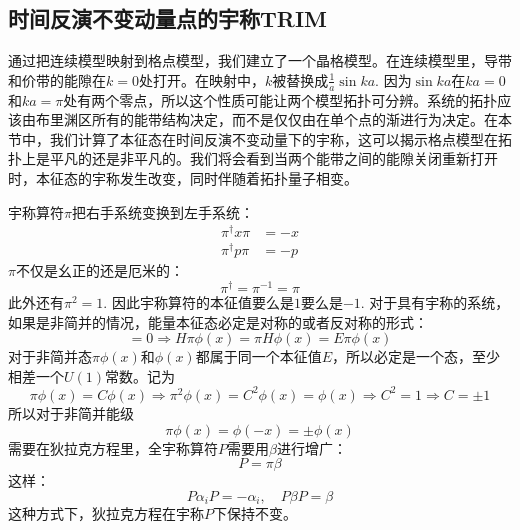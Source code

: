 \documentclass{article}
\numberwithin{equation}{subsection}
\begin{document}
\subsection{时间反演不变动量点的宇称TRIM}
通过把连续模型映射到格点模型，我们建立了一个晶格模型。在连续模型里，导带和价带的能隙在$k=0$处打开。在映射中，$k$被替换成$\frac{1}{a}\sin ka$. 因为$\sin ka$在$ka=0$和$ka=\pi$处有两个零点，所以这个性质可能让两个模型拓扑可分辨。系统的拓扑应该由布里渊区所有的能带结构决定，而不是仅仅由在单个点的渐进行为决定。在本节中，我们计算了本征态在时间反演不变动量下的宇称，这可以揭示格点模型在拓扑上是平凡的还是非平凡的。我们将会看到当两个能带之间的能隙关闭重新打开时，本征态的宇称发生改变，同时伴随着拓扑量子相变。

宇称算符$\pi$把右手系统变换到左手系统：
\begin{equation}
    \begin{split}
        \pi^\dagger x\pi&=-x\\
        \pi^\dagger p\pi&=-p
    \end{split}
\end{equation}
$\pi$不仅是幺正的还是厄米的：
\begin{equation}
    \pi^\dagger=\pi^{-1}=\pi
\end{equation}
此外还有$\pi^2=1$. 因此宇称算符的本征值要么是$1$要么是$-1$. 对于具有宇称的系统，如果是非简并的情况，能量本征态必定是对称的或者反对称的形式：
\begin{equation}
    [H,\pi]=0\Longrightarrow H\pi\phi(x)=\pi H\phi(x)=E\pi\phi(x)
\end{equation}
对于非简并态$\pi\phi(x)$和$\phi(x)$都属于同一个本征值$E$，所以必定是一个态，至少相差一个$U(1)$常数。记为
\begin{equation}
    \pi\phi(x)=C\phi(x)\Longrightarrow\pi^2\phi(x)=C^2\phi(x)=\phi(x)\Longrightarrow C^2=1\Longrightarrow C=\pm1
\end{equation}
所以对于非简并能级
\begin{equation}
    \pi\phi(x)=\phi(-x)=\pm\phi(x)
\end{equation}
需要在狄拉克方程里，全宇称算符$P$需要用$\beta$进行增广：
\begin{equation}
    P=\pi\beta
\end{equation}
这样：
\begin{equation}
    P\alpha_iP=-\alpha_i,\quad P\beta P=\beta
\end{equation}
这种方式下，狄拉克方程在宇称$P$下保持不变。
\end{document}
